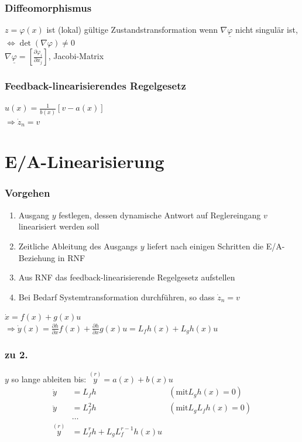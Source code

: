 \documentclass[german]{latex4ei/latex4ei_sheet}
\begin{document}
\subsubsection*{Diffeomorphismus}
$z = \varphi(x)$ ist (lokal) gültige Zustandstransformation wenn $\nabla \underline{\varphi}$ nicht singulär ist, $\Leftrightarrow \det(\nabla \varphi) \neq 0$ \\
$\nabla \underline{\varphi} = \left[ \frac{\partial \varphi_i}{\partial x_j} \right]$, Jacobi-Matrix

\subsubsection*{Feedback-linearisierendes Regelgesetz}
$u(x) = \frac{1}{b(x)}[v - a(x)]$ \\
$\Rightarrow \dot{z}_n = v $


\section{E/A-Linearisierung}

\subsubsection*{Vorgehen}
\begin{enumerate}
  \item Ausgang $y$ festlegen, dessen dynamische Antwort auf Reglereingang $v$ linearisiert werden soll
  \item Zeitliche Ableitung des Ausgangs $y$ liefert nach einigen Schritten  die E/A-Beziehung in RNF
  \item Aus RNF das feedback-linearisierende Regelgesetz aufstellen
  \item Bei Bedarf Systemtransformation durchführen, so dass $\dot{z}_n = v$
\end{enumerate}

$\dot{x} = f(x) + g(x)u$ \\
$\Rightarrow \dot{y}(x) = \frac{\partial h}{\partial x}f(x) + \frac{\partial h}{\partial x}g(x)u = L_f h(x) + L_g h(x) u$ \\

\subsubsection*{zu 2.}
$y$ so lange ableiten bis: $\overset{(r)}{y} = a(x) + b(x) u$ \\
\begin{align*}
  \dot{y}           &= L_f h                            &(\text{mit} L_g h(x) = 0) \\
  \ddot{y}          &= L_f^2 h                          &(\text{mit} L_g L_f h(x) = 0) \\
                    &\dots                              & \\
  \overset{(r)}{y}  &= L_f^r h + L_g L_f^{r-1} h(x) u   &
\end{align*}
\end{document}
